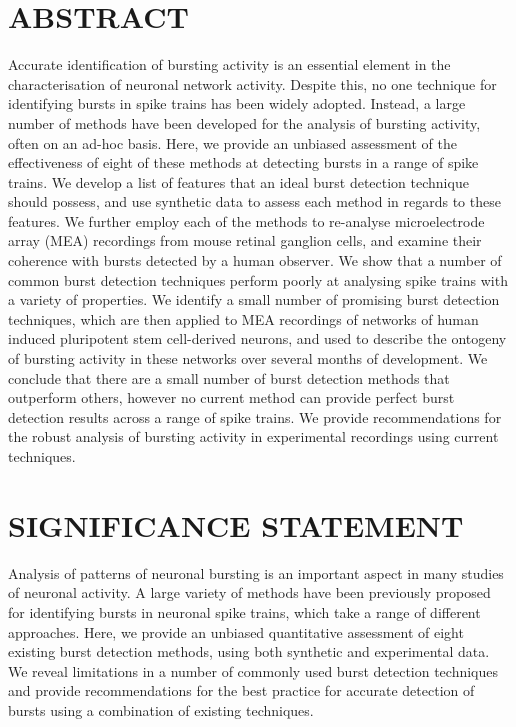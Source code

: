 \documentclass[12pt, titlepage]{article}
\begin{document}
	\section*{ABSTRACT}
	Accurate identification of bursting activity is an essential element in the characterisation of neuronal network activity. Despite this, no one technique for identifying bursts in spike trains has been widely adopted. Instead, a large number of methods have been developed for the analysis of bursting activity, often on an ad-hoc basis. Here, we provide an unbiased assessment of the effectiveness of eight of these methods at detecting bursts in a range of spike trains. We develop a list of features that an ideal burst detection technique should possess, and use synthetic data to assess each method in regards to these features. We further employ each of the methods to re-analyse microelectrode array (MEA) recordings from mouse retinal ganglion cells, and examine their coherence with bursts detected by a human observer. We show that a number of common burst detection techniques perform poorly at analysing spike trains with a variety of properties. We identify a small number of promising burst detection techniques, which are then applied to MEA recordings of networks of human induced pluripotent stem cell-derived neurons, and used to describe the ontogeny of bursting activity in these networks over several months of development. We conclude that there are a small number of burst detection methods that outperform others, however no current method can provide perfect burst detection results across a range of spike trains. We provide recommendations for the robust analysis of bursting activity in experimental recordings using current techniques.
	\section*{SIGNIFICANCE STATEMENT}
	Analysis of patterns of neuronal bursting is an important aspect in many studies of neuronal activity. A large variety of methods have been previously proposed for identifying bursts in neuronal spike trains, which take a range of different approaches. Here, we provide an unbiased quantitative assessment of eight existing burst detection methods, using both synthetic and experimental data. We reveal limitations in a number of commonly used burst detection techniques and provide recommendations for the best practice for accurate detection of bursts using a combination of existing techniques. 
\end{document}
